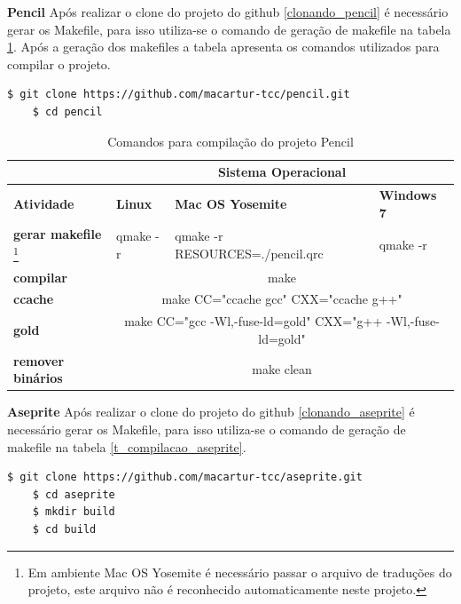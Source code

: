 \begin{itemize}
    \subitem \textbf{Pencil}
    \subitem Após realizar o clone do projeto do github
\ref{clonando_pencil} é necessário  gerar os Makefile,
 para isso utiliza-se o comando de geração de makefile na tabela \ref{t_compilacao_pencil}.
Após a geração dos makefiles a tabela apresenta os comandos utilizados para compilar o projeto.

\begin{lstlisting}[language=bash, caption={Clonado Projeto Pencil},
                  label=clonando_pencil]
    $ git clone https://github.com/macartur-tcc/pencil.git
    $ cd pencil
\end{lstlisting}


\begin{table}[h]
\begin{tabular}{p{2cm}p{2cm}p{2cm}p{2cm}}
\toprule
 & \multicolumn{3}{c}{Sistema Operacional} \\ \toprule 
\textbf{Atividade} & \textbf{Linux} & \textbf{Mac OS Yosemite} & \textbf{Windows 7}  \\ \midrule 
\textbf{gerar makefile}
\footnote{Em ambiente Mac OS Yosemite é necessário passar o arquivo de traduções do projeto, este arquivo não é reconhecido automaticamente neste projeto.}
 & qmake -r & qmake -r RESOURCES=./pencil.qrc  & qmake -r \\ \midrule
\textbf{compilar} & \multicolumn{3}{c}{make } \\ \midrule
\textbf{ccache} & \multicolumn{3}{c}{make CC="ccache gcc" CXX="ccache g++"} \\ \midrule
\textbf{gold} & \multicolumn{3}{c}{make CC="gcc -Wl,-fuse-ld=gold" CXX="g++ -Wl,-fuse-ld=gold"} \\ \midrule
\textbf{remover binários} & \multicolumn{3}{c}{make clean} \\ \bottomrule
\end{tabular} 
\caption{Comandos para compilação do projeto Pencil}
\label{t_compilacao_pencil}
\end{table}

    \subitem \textbf{Aseprite}
    \subitem Após realizar o clone do projeto do github
\ref{clonando_aseprite} é necessário  gerar os Makefile,
 para isso utiliza-se o comando de geração de makefile na tabela 
\ref{t_compilacao_aseprite}.

\begin{lstlisting}[language=bash, caption={Clonado Projeto Aseprite e criando diretório de Compilação},
                  label=clonando_aseprite]
    $ git clone https://github.com/macartur-tcc/aseprite.git
    $ cd aseprite
    $ mkdir build
    $ cd build
\end{lstlisting}



\end{itemize}
